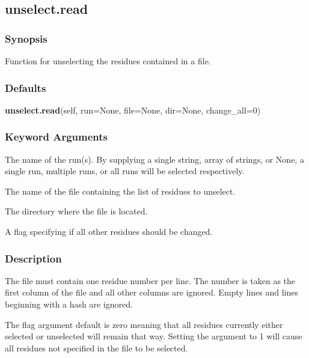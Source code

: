 


\newpage

\subsection{unselect.read}


\subsubsection{Synopsis}

Function for unselecting the residues contained in a file.



\subsubsection{Defaults}

\textsf{\textbf{unselect.read}(self, run=None, file=None, dir=None, change\_all=0)}


\subsubsection{Keyword Arguments}

  The name of the run(s).  By supplying a single string, array of strings, or None, a single run, multiple runs, or all runs will be selected respectively. 

  The name of the file containing the list of residues to unselect. 

  The directory where the file is located. 

  A flag specifying if all other residues should be changed. 




\subsubsection{Description}

The file must contain one residue number per line.  The number is taken as the first column of the file and all other columns are ignored.  Empty lines and lines beginning with a hash are ignored.


The  flag argument default is zero meaning that all residues currently either selected or unselected will remain that way.  Setting the argument to 1 will cause all residues not specified in the file to be selected.



